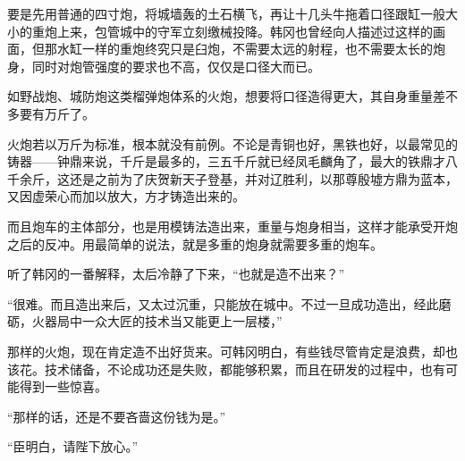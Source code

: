 要是先用普通的四寸炮，将城墙轰的土石横飞，再让十几头牛拖着口径跟缸一般大小的重炮上来，包管城中的守军立刻缴械投降。韩冈也曾经向人描述过这样的画面，但那水缸一样的重炮终究只是臼炮，不需要太远的射程，也不需要太长的炮身，同时对炮管强度的要求也不高，仅仅是口径大而已。

如野战炮、城防炮这类榴弹炮体系的火炮，想要将口径造得更大，其自身重量差不多要有万斤了。

火炮若以万斤为标准，根本就没有前例。不论是青铜也好，黑铁也好，以最常见的铸器——钟鼎来说，千斤是最多的，三五千斤就已经凤毛麟角了，最大的铁鼎才八千余斤，这还是之前为了庆贺新天子登基，并对辽胜利，以那尊殷墟方鼎为蓝本，又因虚荣心而加以放大，方才铸造出来的。

而且炮车的主体部分，也是用模铸法造出来，重量与炮身相当，这样才能承受开炮之后的反冲。用最简单的说法，就是多重的炮身就需要多重的炮车。

听了韩冈的一番解释，太后冷静了下来，“也就是造不出来？”

“很难。而且造出来后，又太过沉重，只能放在城中。不过一旦成功造出，经此磨砺，火器局中一众大匠的技术当又能更上一层楼，”

那样的火炮，现在肯定造不出好货来。可韩冈明白，有些钱尽管肯定是浪费，却也该花。技术储备，不论成功还是失败，都能够积累，而且在研发的过程中，也有可能得到一些惊喜。

“那样的话，还是不要吝啬这份钱为是。”

“臣明白，请陛下放心。”
